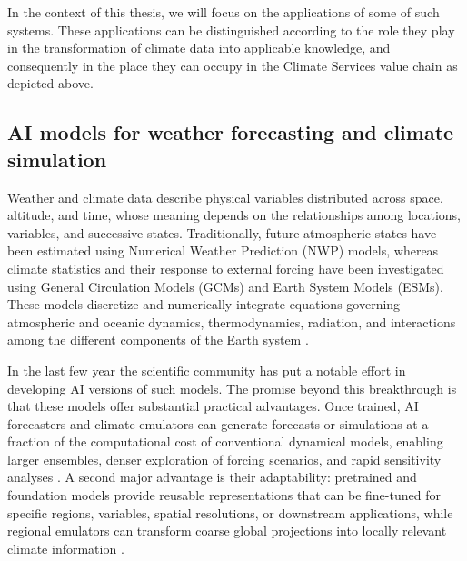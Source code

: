 In the context of this thesis, we will focus on the applications of some of such systems. These applications can be distinguished according to the role they play in the transformation of climate data into applicable knowledge, and consequently in the place they can occupy in the Climate Services value chain as depicted above.


\subsection{AI models for weather forecasting and climate simulation}

Weather and climate data describe physical variables distributed across space, altitude, and time, whose meaning depends on the relationships among locations, variables, and successive states. Traditionally, future atmospheric states have been estimated using Numerical Weather Prediction (NWP) models, whereas climate statistics and their response to external forcing have been investigated using General Circulation Models (GCMs) and Earth System Models (ESMs). These models discretize and numerically integrate equations governing atmospheric and oceanic dynamics, thermodynamics, radiation, and interactions among the different components of the Earth system \citep{bauer_quiet_2015}.

In the last few year the scientific community has put a notable effort in developing AI versions of such models. The promise beyond this breakthrough is that these models offer substantial practical advantages. Once trained, AI forecasters and climate emulators can generate forecasts or simulations at a fraction of the computational cost of conventional dynamical models, enabling larger ensembles, denser exploration of forcing scenarios, and rapid sensitivity analyses \citep{van_katwyk_rewiring_2026}. A second major advantage is their adaptability: pretrained and foundation models provide reusable representations that can be fine-tuned for specific regions, variables, spatial resolutions, or downstream applications, while regional emulators can transform coarse global projections into locally relevant climate information \citep{kendon_potential_2025}. 

